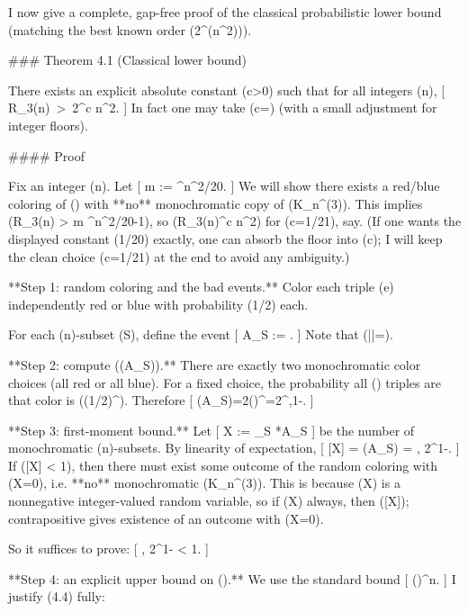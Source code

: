 I now give a complete, gap-free proof of the classical probabilistic lower bound (matching the best known order (2^{\Omega(n^2)})).

### Theorem 4.1 (Classical lower bound)

There exists an explicit absolute constant (c>0) such that for all integers (n),
[
R_3(n)\ >\ 2^{c n^2}.
]
In fact one may take (c=) (with a small adjustment for integer floors).

#### Proof

Fix an integer (n). Let
[
m := \left{}^{n^2/20}\right\rfloor.
]
We will show there exists a red/blue coloring of () with **no** monochromatic copy of (K_n^{(3)}). This implies (R_3(n) > m ^{n^2/20-1}), so (R_3(n)^{c n^2}) for (c=1/21), say. (If one wants the displayed constant (1/20) exactly, one can absorb the floor into (c); I will keep the clean choice (c=1/21) at the end to avoid any ambiguity.)

**Step 1: random coloring and the bad events.**
Color each triple (e\in{}) independently red or blue with probability (1/2) each.

For each (n)-subset (S\in{}), define the event
[
A_S := {}.
]
Note that (||=).

**Step 2: compute (\Pr(A_S)).**
There are exactly two monochromatic color choices (all red or all blue). For a fixed choice, the probability all () triples are that color is ((1/2)^{}). Therefore
[
\Pr(A_S)=2\cdot\left(\right)^{}=2^{,1-}.
]

**Step 3: first-moment bound.**
Let
[
X := \sum_{S\in{}} *{A_S}
]
be the number of monochromatic (n)-subsets. By linearity of expectation,
[
[X] =  \Pr(A_S)
= , 2^{1-}.
]
If ([X] < 1), then there must exist some outcome of the random coloring with (X=0), i.e. **no** monochromatic (K_n^{(3)}). This is because (X) is a nonnegative integer-valued random variable, so if (X) always, then ([X]); contrapositive gives existence of an outcome with (X=0).

So it suffices to prove:
[
, 2^{1-} < 1.
]

**Step 4: an explicit upper bound on ().**
We use the standard bound
[
 \le \left(\right)^n.
]
I justify (4.4) fully:

